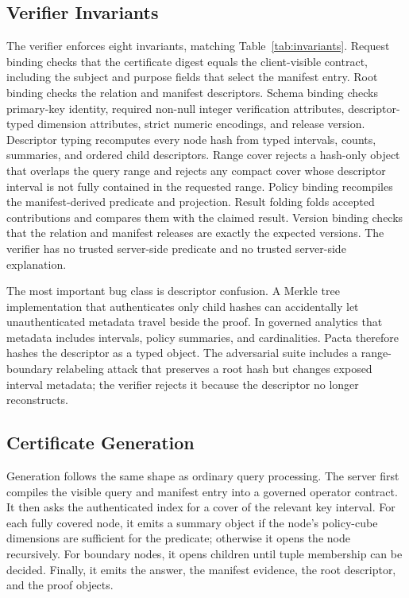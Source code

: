\documentclass[conference]{IEEEtran}
\newcommand{\sys}{Pacta\xspace}
\begin{document}
\subsection{Verifier Invariants}
The verifier enforces eight invariants, matching Table~\ref{tab:invariants}. Request binding checks that the certificate digest equals the client-visible contract, including the subject and purpose fields that select the manifest entry. Root binding checks the relation and manifest descriptors. Schema binding checks primary-key identity, required non-null integer verification attributes, descriptor-typed dimension attributes, strict numeric encodings, and release version. Descriptor typing recomputes every node hash from typed intervals, counts, summaries, and ordered child descriptors. Range cover rejects a hash-only object that overlaps the query range and rejects any compact cover whose descriptor interval is not fully contained in the requested range. Policy binding recompiles the manifest-derived predicate and projection. Result folding folds accepted contributions and compares them with the claimed result. Version binding checks that the relation and manifest releases are exactly the expected versions. The verifier has no trusted server-side predicate and no trusted server-side explanation.

The most important bug class is descriptor confusion. A Merkle tree implementation that authenticates only child hashes can accidentally let unauthenticated metadata travel beside the proof. In governed analytics that metadata includes intervals, policy summaries, and cardinalities. \sys therefore hashes the descriptor as a typed object. The adversarial suite includes a range-boundary relabeling attack that preserves a root hash but changes exposed interval metadata; the verifier rejects it because the descriptor no longer reconstructs.

\subsection{Certificate Generation}
Generation follows the same shape as ordinary query processing. The server first compiles the visible query and manifest entry into a governed operator contract. It then asks the authenticated index for a cover of the relevant key interval. For each fully covered node, it emits a summary object if the node's policy-cube dimensions are sufficient for the predicate; otherwise it opens the node recursively. For boundary nodes, it opens children until tuple membership can be decided. Finally, it emits the answer, the manifest evidence, the root descriptor, and the proof objects.
\end{document}
